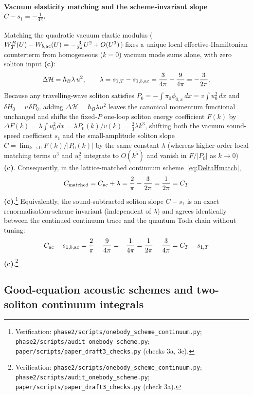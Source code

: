 \documentclass[11pt,a4paper]{article}
\newcommand{\lab}[1]{{\normalfont\sffamily\footnotesize\bfseries(#1)}}
\newcommand{\Lc}{\lab{c}}
\newcommand{\scr}[1]{\nolinkurl{#1}}
\newcommand{\chk}[1]{\footnote{\raggedright Verification: #1.}}
\newcommand{\hb}{\hbar}
\theoremstyle{remark}
\begin{document}
\paragraph{Vacuum elasticity matching and the scheme-invariant slope $C-s_1=-\tfrac1{4\pi}$.} Matching the quadratic vacuum elastic modulus ($W_T^B(U)-W_{b,{\rm ac}}(U)=-\frac3{2\pi}U^2+O(U^3)$) fixes a unique local effective-Hamiltonian counterterm from homogeneous ($k=0$) vacuum mode sums alone, with zero soliton input \Lc:
\begin{equation}\label{eq:DeltaHmatch}
\Delta\mathcal H=\hb_B\lambda\,u^2,\qquad
\lambda=s_{1,T}-s_{1,b,{\rm ac}}=\frac3{4\pi}-\frac9{4\pi}=-\frac3{2\pi}.
\end{equation}
Because any travelling-wave soliton satisfies $P_0=-\int\pi_0\phi_{0,x}\,dx=v\int u_0^2\,dx$ and $\delta H_0=v\,\delta P_0$, adding $\Delta\mathcal H=\hb_B\lambda u^2$ leaves the canonical momentum functional unchanged and shifts the fixed-$P$ one-loop soliton energy coefficient $F(k)$ by $\Delta F(k)=\lambda\int u_0^2\,dx=\lambda P_0(k)/v(k)=\tfrac23\lambda k^3$, shifting both the vacuum sound-speed coefficient $s_1$ and the small-amplitude soliton slope $C=\lim_{k\to0}F(k)/|P_0(k)|$ by the same constant $\lambda$ (whereas higher-order local matching terms $u^3$ and $u_x^2$ integrate to $O(k^5)$ and vanish in $F/|P_0|$ as $k\to0$) \Lc. Consequently, in the lattice-matched continuum scheme~\eqref{eq:DeltaHmatch},
\begin{equation}\label{eq:Cmatched}
C_{\rm matched}=C_{\rm ac}+\lambda=\frac2\pi-\frac3{2\pi}=\frac1{2\pi}=C_T
\end{equation}
\Lc.\chk{\scr{phase2/scripts/onebody_scheme_continuum.py}; \scr{phase2/scripts/audit_onebody_scheme.py}; \scr{paper/scripts/paper_draft3_checks.py} (checks 3a, 3c)}
Equivalently, the sound-subtracted soliton slope $C-s_1$ is an exact renormalisation-scheme invariant (independent of $\lambda$) and agrees identically between the continued continuum trace and the quantum Toda chain without tuning:
\begin{equation}\label{eq:schemeinv}
C_{\rm ac}-s_{1,b,{\rm ac}}=\frac2\pi-\frac9{4\pi}=-\frac1{4\pi}=\frac1{2\pi}-\frac3{4\pi}=C_T-s_{1,T}
\end{equation}
\Lc.\chk{\scr{phase2/scripts/onebody_scheme_continuum.py}; \scr{phase2/scripts/audit_onebody_scheme.py}; \scr{paper/scripts/paper_draft3_checks.py} (check 3a)}

\subsection{Good-equation acoustic schemes and two-soliton continuum integrals}\label{sec:goodoneloop}
\end{document}
